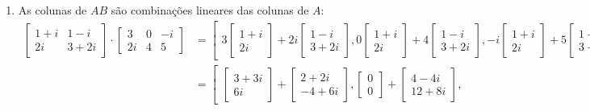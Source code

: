\documentclass[12pt,a4paper]{article}
\begin{document}
\begin{enumerate}
\begin{enumerate}
\item As colunas de $AB$ são combinações lineares das colunas de $A$:
\begin{align*}
\begin{bmatrix}
1+i & 1-i \\
 2i & 3+2i
\end{bmatrix}
\cdot
\begin{bmatrix}
3 & 0 & -i \\
 2i & 4 & 5
\end{bmatrix}
& = %
\left[\begin{smallmatrix}
3
\begin{bmatrix}
1+i \\
 2i
\end{bmatrix}
+2i
\begin{bmatrix}
1-i \\
3+2i
\end{bmatrix},
0
\begin{bmatrix}
1+i \\
 2i
\end{bmatrix}
+4
\begin{bmatrix}
1-i \\
3+2i
\end{bmatrix},
-i
\begin{bmatrix}
1+i \\
 2i
\end{bmatrix}
+5
\begin{bmatrix}
1-i \\
3+2i
\end{bmatrix}
\end{smallmatrix}\right]
\\
& = %
\left[\begin{smallmatrix}
\begin{bmatrix}
3+3i \\
6i
\end{bmatrix}
+
\begin{bmatrix}
2+2i \\
-4+6i
\end{bmatrix},
\begin{bmatrix}
0 \\
0
\end{bmatrix}
+
\begin{bmatrix}
4-4i \\
12+8i
\end{bmatrix},

\end{smallmatrix}
\end{align*}
\end{enumerate}
\end{enumerate}
\end{document}
